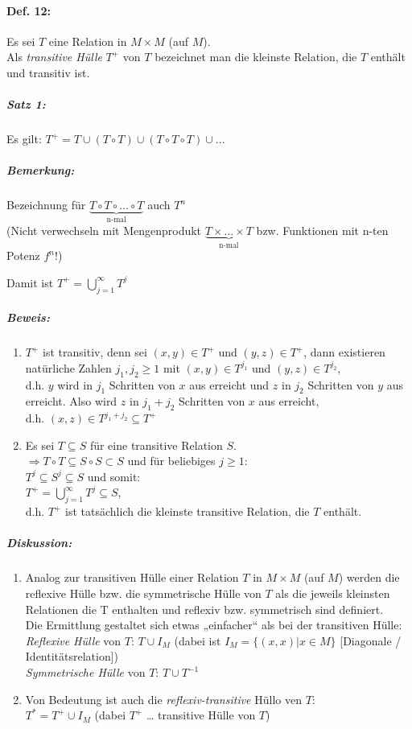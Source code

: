 \paragraph{Def. 12:} \parskp
Es sei $T$ eine Relation in $M \times M$ (auf $M$).\\
Als \emph{transitive Hülle} $T^+$ von $T$ bezeichnet man die kleinste Relation, die $T$ enthält und transitiv ist.
\subparagraph{Satz 1:} Es gilt: $\boxed{T^+ = T \cup (T\circ T) \cup (T\circ T \circ T) \cup ...}$
\subparagraph{Bemerkung:} \parskp
Bezeichnung für $\underbrace{T\circ T \circ ...\circ T}_{\text{n-mal}}$ auch $T^n$\\
(Nicht verwechseln mit Mengenprodukt $\underbrace{T\times ... \times T }_{\text{n-mal}}$ bzw. Funktionen mit n-ten Potenz $f^n$!)

Damit ist $\boxed{T^+= \bigcup^{\infty}_{j=1}T^j}$

\subparagraph{Beweis:} 
\begin{enumerate}
\item $T^+$ ist transitiv, denn sei $(x,y)\in T^+$ und $(y,z)\in T^+$, dann existieren natürliche Zahlen $j_1, j_2 \geq 1$ mit $(x,y)\in T^{j_1}$ und $(y,z)\in T^{j_2}$, \\
d.h. $y$ wird in $j_1$ Schritten von $x$ aus erreicht und $z$ in $j_2$ Schritten von $y$ aus erreicht. Also wird $z$ in $j_1 + j_2 $ Schritten von $x$ aus erreicht, \\
d.h. $(x,z) \in T^{j_1+j_2} \subseteq T^+$
\item Es sei $T\subseteq S$ für eine transitive Relation $S$.\\
$\Rightarrow T\circ T \subseteq S \circ S \subset S$ und für beliebiges $j\geq 1$:\\
$T^j \subseteq S^j \subseteq S$ und somit:\\
$T^+ = \bigcup^{\infty}_{j=1}T^j \subseteq S$, \\
d.h. $T^+$ ist tatsächlich die kleinste transitive Relation, die $T$ enthält.
\end{enumerate}
\subparagraph{Diskussion:}
\begin{enumerate}
\item Analog zur transitiven Hülle einer Relation $T$ in $M\times M$ (auf $M$) werden die reflexive Hülle bzw. die symmetrische Hülle von $T$ als die jeweils kleinsten Relationen die T enthalten und reflexiv bzw. symmetrisch sind definiert.\\
Die Ermittlung gestaltet sich etwas „einfacher“ als bei der transitiven Hülle:\\
\emph{Reflexive Hülle} von $T$: $\boxed{T\cup I_M}$ (dabei ist $I_M=\{(x,x)|x\in M\}$ [Diagonale / Identitätsrelation])\\
\emph{Symmetrische Hülle} von $T$: $\boxed{T \cup T^{-1}}$
\item Von Bedeutung ist auch die \emph{reflexiv-transitive} Hüllo ven $T$:\\
$\boxed{T^*=T^+\cup I_M}$ (dabei $T^+$ … transitive Hülle von $T$)
\end{enumerate}

